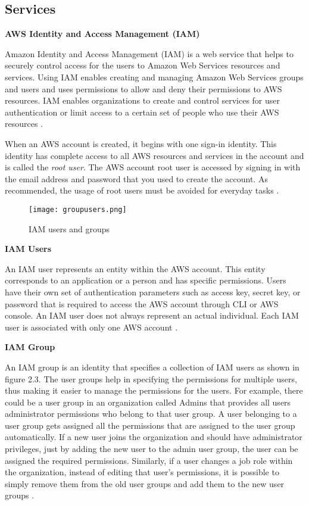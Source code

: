 \subsection{Services}

\textbf{AWS Identity and Access Management (IAM)}

\par Amazon Identity and Access Management (IAM) is a web service that helps to securely control access for the users to Amazon Web Services resources and services.
Using IAM enables creating and managing Amazon Web Services groups and users and uses permissions to allow and deny their permissions to AWS resources.
IAM enables organizations to create and control services for user authentication or limit access to a certain set of people who use their AWS resources \cite{23}.


\par When an AWS account is created, it begins with one
sign-in identity.
This identity has
complete access to all AWS resources and services in the account and is called the \textit{root user}.
The AWS account root
user is accessed by signing in with the email address and password that you used to create the account.
As
recommended, the usage of root users must be avoided for everyday tasks \cite{24}.


\begin{figure}
    \centering
    \texttt{[image: groupusers.png]}
    \caption{IAM users and groups}
    \label{fig:groupusers}
\end{figure}

\textbf{IAM Users}

\par An IAM user represents an entity within the AWS account.
This entity corresponds to an application or a person and has specific permissions.
Users have their own set of authentication parameters such as access key, secret key, or password that is required to access the AWS account through CLI or AWS console.
An IAM user does not always represent an actual individual.
Each IAM user is associated with only one AWS account \cite{25}.
\hfill \break

\textbf{IAM Group}
\par An IAM group is an identity that specifies a collection of IAM users as shown in figure 2.3. The user groups help in specifying the permissions for multiple users, thus making it easier to manage the permissions for the users. For example, there could be a user group in an organization called Admins that provides all users administrator permissions who belong to that user group. A user belonging to a user group gets assigned all the permissions that are assigned to the user group automatically. If a new user joins the organization and should have administrator privileges, just by adding the new user to the admin user group, the user can be assigned the required permissions. Similarly, if a user changes a job role within the organization, instead of editing that user’s permissions, it is possible to simply remove them from the old user groups and add them to the new user groups \cite{25}.
\hfill \break


